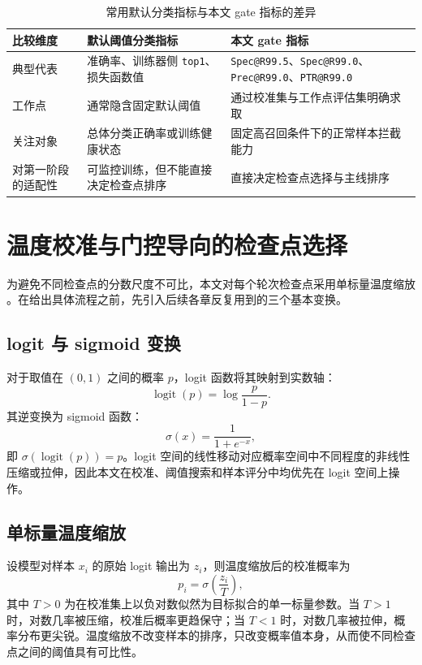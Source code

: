 \documentclass[UTF8,openany,12pt]{ctexbook}
\newcommand{\formalmetric}[1]{\texttt{#1}}
\begin{document}
\begin{table}[H]
    \centering
    \caption{常用默认分类指标与本文 gate 指标的差异}
    \label{tab:formal-metric-difference}
    \begin{tabularx}{\textwidth}{p{3.2cm}XX}
        \toprule
        比较维度 & 默认阈值分类指标 & 本文 gate 指标 \\
        \midrule
        典型代表 & 准确率、训练器侧 \formalmetric{top1}、损失函数值 & \formalmetric{Spec@R99.5}、\formalmetric{Spec@R99.0}、\formalmetric{Prec@R99.0}、\formalmetric{PTR@R99.0} \\
        工作点 & 通常隐含固定默认阈值 & 通过校准集与工作点评估集明确求取 \\
        关注对象 & 总体分类正确率或训练健康状态 & 固定高召回条件下的正常样本拦截能力 \\
        对第一阶段的适配性 & 可监控训练，但不能直接决定检查点排序 & 直接决定检查点选择与主线排序 \\
        \bottomrule
    \end{tabularx}
\end{table}

\section{温度校准与门控导向的检查点选择}
为避免不同检查点的分数尺度不可比，本文对每个轮次检查点采用单标量温度缩放 \cite{guo2017calibration}。在给出具体流程之前，先引入后续各章反复用到的三个基本变换。

\subsection{logit 与 sigmoid 变换}
对于取值在 $(0,1)$ 之间的概率 $p$，logit 函数将其映射到实数轴：
\begin{equation}
\operatorname{logit}(p) = \log\frac{p}{1-p}.
\end{equation}
其逆变换为 sigmoid 函数：
\begin{equation}
\sigma(x) = \frac{1}{1+e^{-x}},
\end{equation}
即 $\sigma(\operatorname{logit}(p)) = p$。logit 空间的线性移动对应概率空间中不同程度的非线性压缩或拉伸，因此本文在校准、阈值搜索和样本评分中均优先在 logit 空间上操作。

\subsection{单标量温度缩放}
设模型对样本 $x_i$ 的原始 logit 输出为 $z_i$，则温度缩放后的校准概率为
\begin{equation}
\label{eq:temperature-scaling}
p_i = \sigma\!\left(\frac{z_i}{T}\right),
\end{equation}
其中 $T > 0$ 为在校准集上以负对数似然为目标拟合的单一标量参数。当 $T > 1$ 时，对数几率被压缩，校准后概率更趋保守；当 $T < 1$ 时，对数几率被拉伸，概率分布更尖锐。温度缩放不改变样本的排序，只改变概率值本身，从而使不同检查点之间的阈值具有可比性。
\end{document}

